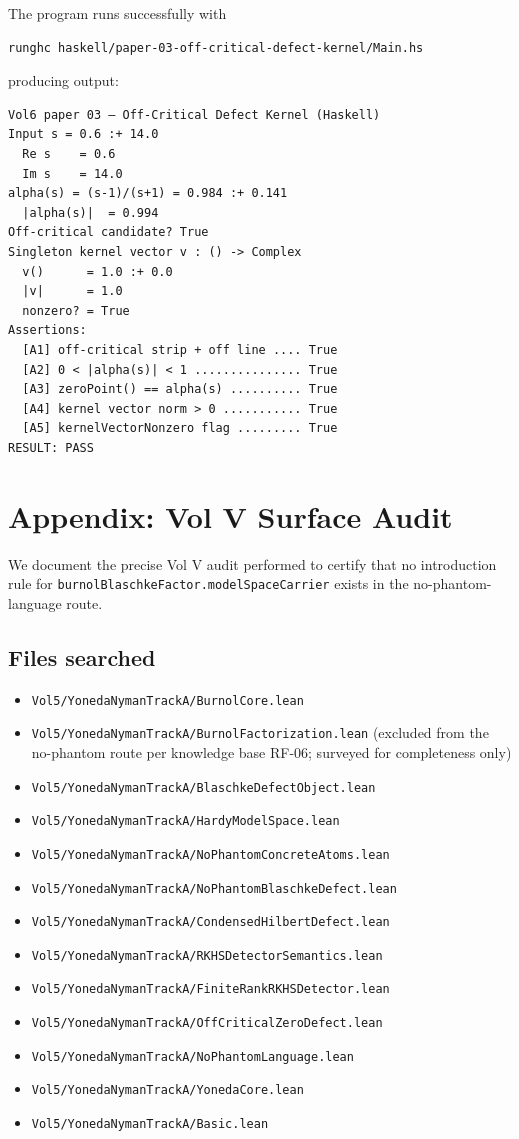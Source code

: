\documentclass[12pt]{article}
\theoremstyle{definition}
\theoremstyle{remark}
\begin{document}
The program runs successfully with
\begin{verbatim}
runghc haskell/paper-03-off-critical-defect-kernel/Main.hs
\end{verbatim}
producing output:
\begin{verbatim}
Vol6 paper 03 — Off-Critical Defect Kernel (Haskell)
Input s = 0.6 :+ 14.0
  Re s    = 0.6
  Im s    = 14.0
alpha(s) = (s-1)/(s+1) = 0.984 :+ 0.141
  |alpha(s)|  = 0.994
Off-critical candidate? True
Singleton kernel vector v : () -> Complex
  v()      = 1.0 :+ 0.0
  |v|      = 1.0
  nonzero? = True
Assertions:
  [A1] off-critical strip + off line .... True
  [A2] 0 < |alpha(s)| < 1 ............... True
  [A3] zeroPoint() == alpha(s) .......... True
  [A4] kernel vector norm > 0 ........... True
  [A5] kernelVectorNonzero flag ......... True
RESULT: PASS
\end{verbatim}

\section{Appendix: Vol V Surface Audit}\label{sec:vol5-audit}

We document the precise Vol V audit performed to certify that no
introduction rule for \texttt{burnolBlaschkeFactor.modelSpaceCarrier}
exists in the no-phantom-language route.

\subsection{Files searched}

\begin{itemize}
\item \texttt{Vol5/YonedaNymanTrackA/BurnolCore.lean}
\item \texttt{Vol5/YonedaNymanTrackA/BurnolFactorization.lean} (excluded
from the no-phantom route per knowledge base RF-06; surveyed for
completeness only)
\item \texttt{Vol5/YonedaNymanTrackA/BlaschkeDefectObject.lean}
\item \texttt{Vol5/YonedaNymanTrackA/HardyModelSpace.lean}
\item \texttt{Vol5/YonedaNymanTrackA/NoPhantomConcreteAtoms.lean}
\item \texttt{Vol5/YonedaNymanTrackA/NoPhantomBlaschkeDefect.lean}
\item \texttt{Vol5/YonedaNymanTrackA/CondensedHilbertDefect.lean}
\item \texttt{Vol5/YonedaNymanTrackA/RKHSDetectorSemantics.lean}
\item \texttt{Vol5/YonedaNymanTrackA/FiniteRankRKHSDetector.lean}
\item \texttt{Vol5/YonedaNymanTrackA/OffCriticalZeroDefect.lean}
\item \texttt{Vol5/YonedaNymanTrackA/NoPhantomLanguage.lean}
\item \texttt{Vol5/YonedaNymanTrackA/YonedaCore.lean}
\item \texttt{Vol5/YonedaNymanTrackA/Basic.lean}
\end{itemize}
\end{document}
